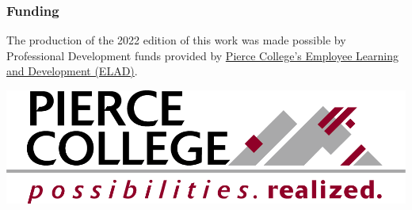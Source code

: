 \subsubsection{Funding}

The production of the 2022 edition of this work was made possible by Professional Development funds provided by \href{https://www.pierce.ctc.edu/elad}{Pierce College's Employee Learning and Development (ELAD)}. 


\includegraphics{marcom-PierceCollege-Logo.png}


\bigskip
